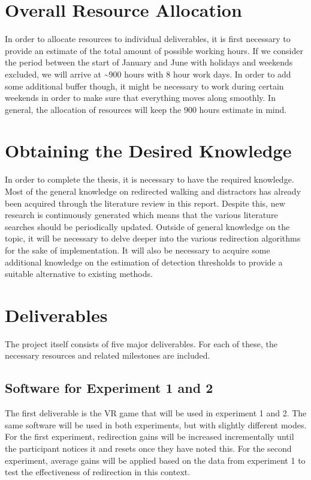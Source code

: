 \section{Overall Resource Allocation}
In order to allocate resources to individual deliverables, it is first necessary to provide an estimate of the total amount of possible working hours. If we consider the period between the start of January and June with holidays and weekends excluded, we will arrive at \textasciitilde900 hours with 8 hour work days. In order to add some additional buffer though, it might be necessary to work during certain weekends in order to make sure that everything moves along smoothly. In general, the allocation of resources will keep the 900 hours estimate in mind.

\section{Obtaining the Desired Knowledge}
In order to complete the thesis, it is necessary to have the required knowledge. Most of the general knowledge on redirected walking and distractors has already been acquired through the literature review in this report. Despite this, new research is continuously generated which means that the various literature searches should be periodically updated.
Outside of general knowledge on the topic, it will be necessary to delve deeper into the various redirection algorithms for the sake of implementation. It will also be necessary to acquire some additional knowledge on the estimation of detection thresholds to provide a suitable alternative to existing methods. 

\section{Deliverables}
The project itself consists of five major deliverables. For each of these, the necessary resources and related milestones are included. 

\subsection{Software for Experiment 1 and 2}
The first deliverable is the VR game that will be used in experiment 1 and 2. The same software will be used in both experiments, but with slightly different modes. For the first experiment, redirection gains will be increased incrementally until the participant notices it and resets once they have noted this. For the second experiment, average gains will be applied based on the data from experiment 1 to test the effectiveness of redirection in this context. 

